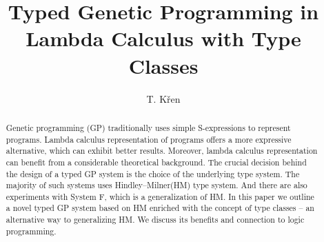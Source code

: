 \documentclass[11pt]{article}
\newcommand{\HM}{Hindley–Milner\xspace}
\newcommand{\red}[1]{{\color{red} #1}}
\begin{document}
\setlength{\pdfpagewidth}{210mm}
\setlength{\pdfpageheight}{297mm}


\title{Typed Genetic Programming in Lambda Calculus with Type Classes}

\author{T. K\v ren}



\begin{abstract}
Genetic programming (GP) traditionally uses simple S-expressions to represent programs. Lambda calculus representation of programs offers a more expressive alternative, which can exhibit better results. Moreover, lambda calculus representation can benefit from a considerable theoretical background. The crucial decision behind the design of a typed GP system is the choice of the underlying type system. The majority of such systems uses \HM (HM) type system. And there are also experiments with System F, which is a generalization of HM. In this paper we outline a novel typed GP system  based on HM enriched with the concept of type classes -- an alternative way to generalizing HM. We discuss its benefits and connection to logic programming. 
\end{abstract}

\end{document}
